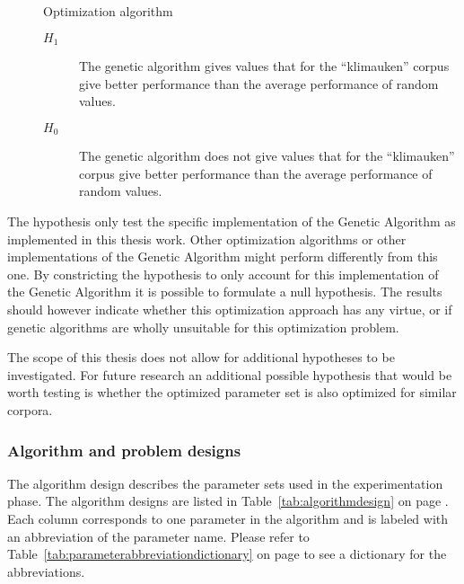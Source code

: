 \begin{description}
	\item []Optimization algorithm
	\begin{description}
	\item [\(H_{1}\)] The genetic algorithm gives values that for the ``klimauken'' corpus give better performance than the average performance of random values.
	\item [\(H_{0}\)] The genetic algorithm does not give values that for the ``klimauken'' corpus give better performance than the average performance of random values.
	\end{description}
\end{description}

The hypothesis only test the specific implementation of the Genetic Algorithm as implemented in this thesis work. Other optimization algorithms or other implementations of the Genetic Algorithm might perform differently from this one. By constricting the hypothesis to only account for this implementation of the Genetic Algorithm it is possible to formulate a null hypothesis. The results should however indicate whether this optimization approach has any virtue, or if genetic algorithms are wholly unsuitable for this optimization problem.

The scope of this thesis does not allow for additional hypotheses to be investigated. For future research an additional possible hypothesis that would be worth testing is whether the optimized parameter set is also optimized for similar corpora.

\subsubsection{Algorithm and problem designs}
The algorithm design describes the parameter sets used in the experimentation phase. The algorithm designs are listed in Table~\ref{tab:algorithmdesign} on page \pageref{tab:algorithmdesign}. Each column corresponds to one parameter in the algorithm and is labeled with an abbreviation of the parameter name. Please refer to Table~\ref{tab:parameterabbreviationdictionary} on page \pageref{tab:parameterabbreviationdictionary} to see a dictionary for the abbreviations.

